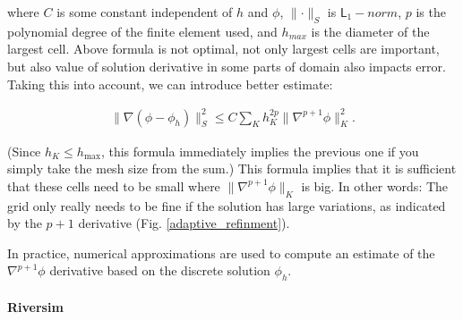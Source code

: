 \documentclass[]{pracamgr}
\begin{document}
        where $C$ is some constant independent of $h$ and $\phi$, $\parallel \cdot \parallel_S $ is $\mathsf{L}_1-norm$, $p$ is the polynomial degree of the finite element used, and $h_{max}$ is the diameter of the largest cell. Above formula is not optimal, not only largest cells are important, but also value of solution derivative in some parts of domain also impacts error. Taking this into account, we can introduce better estimate:
        

        \begin{align*}
          \|\nabla(\phi-\phi_h)\|_{S}^2 \le C \sum_K h_K^{2p} \| \nabla^{p+1} \phi \|^2_K.
        \end{align*}

        (Since $h_K\le h_\text{max}$, this formula immediately implies the previous one if you simply take the mesh size from the sum.) This formula implies that it is sufficient that these cells need to be small where $\| \nabla^{p+1} \phi \|_K$ is big. In other words: The grid only really needs to be fine if the solution has large variations, as indicated by the $p+1$ derivative (Fig. \ref{adaptive_refinment}).
        
        In practice, numerical approximations are used to compute an estimate of the $\nabla^{p+1} \phi$ derivative based on the discrete solution $\phi_h$.

      \paragraph{Riversim}
        
\end{document}
